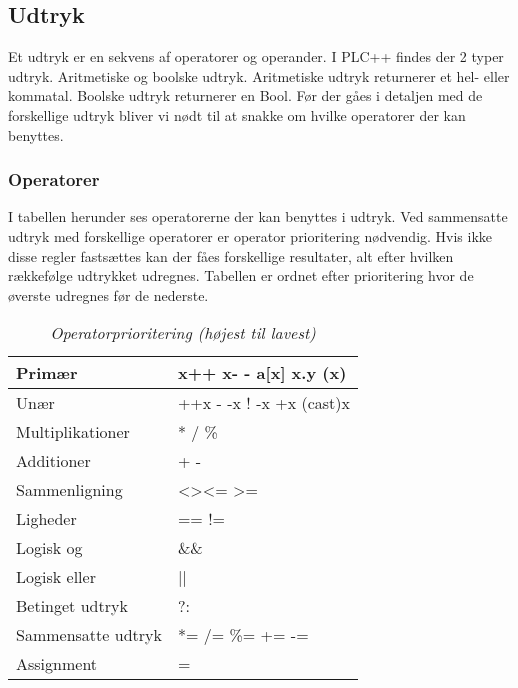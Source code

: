 \subsection{Udtryk}
Et udtryk er en sekvens af operatorer og operander. I PLC++ findes der 2 typer udtryk. Aritmetiske og boolske udtryk. Aritmetiske udtryk returnerer et hel- eller kommatal. Boolske udtryk returnerer en Bool. Før der gåes i detaljen med de forskellige udtryk bliver vi nødt til at snakke om hvilke operatorer der kan benyttes.

\subsubsection{Operatorer}
I tabellen herunder ses operatorerne der kan benyttes i udtryk. Ved sammensatte udtryk med forskellige operatorer er operator prioritering nødvendig. Hvis ikke disse regler fastsættes kan der fåes forskellige resultater, alt efter hvilken rækkefølge udtrykket udregnes. Tabellen er ordnet efter prioritering hvor de øverste udregnes før de nederste.
\begin{table}[H]
    \centering
    \begin{tabular}{|l|l|}
        \hline
        \centering

        Primær             & x++ \quad x- - \quad a{[}x{]} \quad x.y \quad (x)                 \\ \hline
        Unær               & ++x \quad - -x \quad ! \quad -x \quad +x \quad (cast)x       \\ \hline
        Multiplikationer   & * \quad / \quad \%                                               \\ \hline
        Additioner         & + \quad -                                                        \\ \hline
        Sammenligning      & \textless \quad \textgreater \quad \textless= \quad\textgreater= \\ \hline
        Ligheder           & == \quad !=                                                      \\ \hline
        Logisk og          & \&\&                                                              \\ \hline
        Logisk eller       & ||                                                               \\ \hline
        Betinget udtryk    & ?:                                                               \\ \hline
        Sammensatte udtryk & *= \quad /= \quad \%= \quad += \quad -=                          \\ \hline
        Assignment         & =                                                                \\ \hline

    \end{tabular}
    \caption{\textit{Operatorprioritering (højest til lavest)}}
    \label{tab:operatorprioritering}
\end{table}
